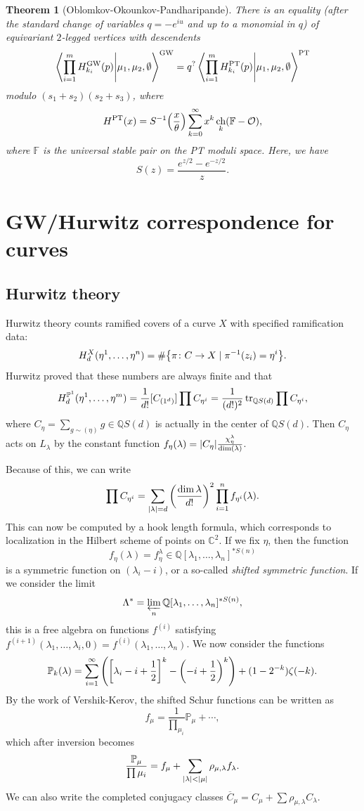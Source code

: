 \documentclass[leqno, openany]{memoir}
\newtheorem{thm}{Theorem}[section]
\theoremstyle{definition}
\theoremstyle{remark}
\theoremstyle{plain}
\theoremstyle{definition}
\theoremstyle{remark}
\newcommand{\F}{\mathbb{F}}
\newcommand{\C}{\mathbb{C}}
\newcommand{\Q}{\mathbb{Q}}
\renewcommand{\P}{\mathbb{P}}
\newcommand{\mc}[1]{\mathcal{#1}}
\newcommand{\mr}[1]{\mathrm{#1}}
\DeclareMathOperator{\ch}{ch}
\begin{document}
\begin{thm}[Oblomkov-Okounkov-Pandharipande]
    There is an equality (after the standard change of variables $q=-e^{iu}$ and up to a monomial in $q$) of equivariant $2$-legged vertices with descendents
    \[ \braket{\prod_{i=1}^m H_{k_i}^{\mr{GW}}(p)}{\mu_1, \mu_2, \emptyset}^{\mr{GW}} = q^? \braket{\prod_{i=1}^m H_{k_i}^{\mr{PT}}(p)}{\mu_1, \mu_2, \emptyset}^{\mr{PT}} \]
    modulo $(s_1+s_2)(s_2+s_3)$, where
    \[ H^{\mr{PT}}(x) = S^{-1} \qty(\frac{x}{\theta}) \sum_{k=0}^{\infty} x^k \ch_k(\F-\mc{O}), \]
    where $\F$ is the universal stable pair on the PT moduli space. Here, we have
    \[ S(z) = \frac{e^{z/2}-e^{-z/2}}{z}. \]
\end{thm}

\section{GW/Hurwitz correspondence for curves}

\subsection{Hurwitz theory}\label{sub:hurwitz}

Hurwitz theory counts ramified covers of a curve $X$ with specified ramification data:
\[ H^X_d(\eta^1, \ldots, \eta^n) = \# \qty{\pi \colon C \to X \mid \pi^{-1}(z_i) = \eta^i}. \]
Hurwitz proved that these numbers are always finite and that
\[ H^{\P^1}_d(\eta^1, \ldots, \eta^m) = \frac{1}{d!} [C_{(1^d)}] \prod C_{\eta^i} = \frac{1}{(d!)^2} \tr_{\Q S(d)} \prod C_{\eta^i}, \]
where $C_{\eta} = \sum_{g \sim (\eta)} g \in \Q S(d)$ is actually in the center of $\Q S(d)$. Then $C_{\eta}$ acts on $L_{\lambda}$ by the constant function $f_{\eta}(\lambda) = \abs{C_{\eta}} \frac{\chi_{\eta}^{\lambda}}{\dim(\lambda)}$. 

Because of this, we can write
\[ \prod C_{\eta^i} = \sum_{\abs{\lambda} = d} \qty(\frac{\dim \lambda}{d!})^2 \prod_{i=1}^n f_{\eta^i}(\lambda). \]
This can now be computed by a hook length formula, which corresponds to localization in the Hilbert scheme of points on $\C^2$. If we fix $\eta$, then the function 
\[ f_{\eta}(\lambda) = f_{\eta}^{\lambda} \in \Q[\lambda_1, \ldots, \lambda_n]^{* S(n)} \]
is a symmetric function on $(\lambda_i - i)$, or a so-called \textit{shifted symmetric function}. If we consider the limit
\[ \Lambda^* = \varprojlim_{n} \Q[\lambda_1, \ldots, \lambda_n]^{*S(n)}, \]
this is a free algebra on functions $f^{(i)}$ satisfying $f^{(i+1)}(\lambda_1, \ldots, \lambda_i, 0) = f^{(i)}(\lambda_1, \ldots, \lambda_n)$. We now consider the functions
\[ \P_k(\lambda) = \sum_{i=1}^{\infty} \qty(\qty[\lambda_i - i + \frac{1}{2}]^k - \qty(-i + \frac{1}{2})^k) + (1-2^{-k}) \zeta(-k). \]
By the work of Vershik-Kerov, the shifted Schur functions can be written as 
\[ f_{\mu} = \frac{1}{\prod_{\mu_i}} \P_{\mu} + \cdots, \]
which after inversion becomes
\[ \frac{\P_{\mu}}{\prod \mu_i} = f_{\mu} + \sum_{\abs{\lambda} < \abs{\mu}} \rho_{\mu, \lambda} f_{\lambda}. \]
We can also write the completed conjugacy classes $\overline{C}_{\mu} = C_{\mu} + \sum \rho_{\mu, \lambda} C_{\lambda}$.
\end{document}
